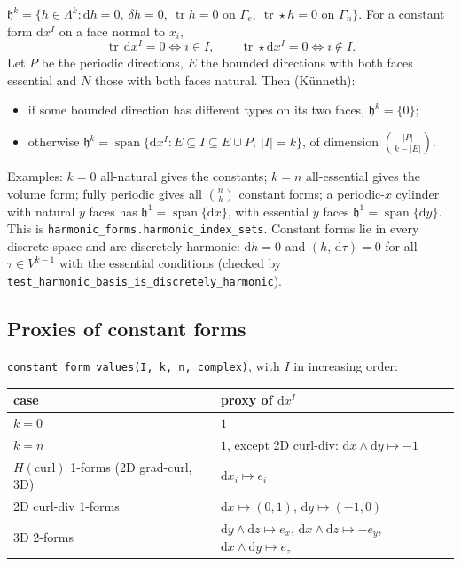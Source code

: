 \documentclass[11pt]{article}
\newcommand{\dd}{\mathrm{d}}
\newcommand{\cod}{\delta}
\newcommand{\tr}{\operatorname{tr}}
\newcommand{\hodge}{\star}
\newcommand{\Hspace}{\mathfrak{h}}
\newcommand{\code}[1]{\texttt{#1}}
\newcommand{\ip}[2]{\left(#1,\,#2\right)}
\theoremstyle{remark}
\begin{document}
$\Hspace^k = \{h\in\Lambda^k: \dd h=0,\ \cod h=0,\ \tr h=0 \text{ on }\Gamma_e,\ \tr\hodge h=0\text{ on }\Gamma_n\}$.
For a constant form $\dd x^I$ on a face normal to $x_i$,
\[
  \tr\,\dd x^I = 0 \iff i\in I, \qquad \tr\hodge\dd x^I = 0 \iff i\notin I .
\]
Let $P$ be the periodic directions, $E$ the bounded directions with both faces essential and $N$
those with both faces natural. Then (K\"unneth):
\begin{itemize}
\item if some bounded direction has different types on its two faces, $\Hspace^k=\{0\}$;
\item otherwise $\Hspace^k=\operatorname{span}\{\dd x^I: E\subseteq I\subseteq E\cup P,\ |I|=k\}$,
  of dimension $\binom{|P|}{k-|E|}$.
\end{itemize}
Examples: $k=0$ all-natural gives the constants; $k=n$ all-essential gives the volume form; fully
periodic gives all $\binom{n}{k}$ constant forms; a periodic-$x$ cylinder with natural $y$ faces has
$\Hspace^1=\operatorname{span}\{\dd x\}$, with essential $y$ faces $\Hspace^1=\operatorname{span}\{\dd y\}$.
This is \code{harmonic\_forms.harmonic\_index\_sets}. Constant forms lie in every discrete space
and are discretely harmonic: $\dd h=0$ and $\ip{h}{\dd\tau}=0$ for all $\tau\in V^{k-1}$ with the
essential conditions (checked by \code{test\_harmonic\_basis\_is\_discretely\_harmonic}).

\subsection{Proxies of constant forms}\label{sec:constant}

\code{constant\_form\_values(I, k, n, complex)}, with $I$ in increasing order:

\begin{center}
\renewcommand{\arraystretch}{1.2}
\begin{tabular}{@{}ll@{}}
\toprule
case & proxy of $\dd x^I$\\
\midrule
$k=0$ & $1$\\
$k=n$ & $1$, except 2D curl-div: $\dd x\wedge\dd y\mapsto -1$\\
$H(\mathrm{curl})$ 1-forms (2D grad-curl, 3D) & $\dd x_i\mapsto e_i$\\
2D curl-div 1-forms & $\dd x\mapsto(0,1)$, $\dd y\mapsto(-1,0)$\\
3D 2-forms & $\dd y\wedge\dd z\mapsto e_x$, $\dd x\wedge\dd z\mapsto -e_y$, $\dd x\wedge\dd y\mapsto e_z$\\
\bottomrule
\end{tabular}
\end{center}
\end{document}
